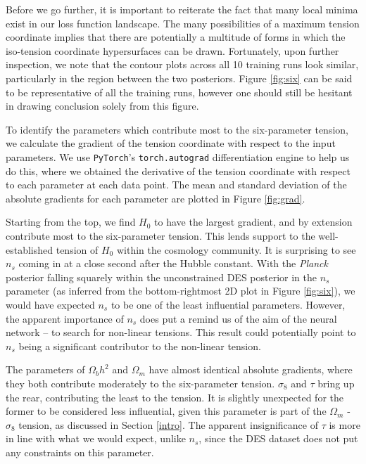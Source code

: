 \documentclass[%
 reprint,
 amsmath,amssymb,
 aps,
]{revtex4-2}
\begin{document}
Before we go further, it is important to reiterate the fact that many local minima exist in our loss function landscape. The many possibilities of a maximum tension coordinate implies that there are potentially a multitude of forms in which the iso-tension coordinate hypersurfaces can be drawn. Fortunately, upon further inspection, we note that the contour plots across all 10 training runs look similar, particularly in the region between the two posteriors. Figure \ref{fig:six} can be said to be representative of all the training runs, however one should still be hesitant in drawing conclusion solely from this figure.

To identify the parameters which contribute most to the six-parameter tension, we calculate the gradient of the tension coordinate with respect to the input parameters. We use \texttt{PyTorch}'s \texttt{torch.autograd} differentiation engine to help us do this, where we obtained the derivative of the tension coordinate with respect to each parameter at each data point. The mean and standard deviation of the absolute gradients for each parameter are plotted in Figure \ref{fig:grad}.

Starting from the top, we find $H_0$ to have the largest gradient, and by extension contribute most to the six-parameter tension. This lends support to the well-established tension of $H_0$ within the cosmology community. It is surprising to see $n_s$ coming in at a close second after the Hubble constant. With the \textit{Planck} posterior falling squarely within the unconstrained DES posterior in the $n_s$ parameter (as inferred from the bottom-rightmost 2D plot in Figure \ref{fig:six}), we would have expected $n_s$ to be one of the least influential parameters. However, the apparent importance of $n_s$ does put a remind us of the aim of the neural network -- to search for non-linear tensions. This result could potentially point to $n_s$ being a significant contributor to the non-linear tension. 

The parameters of $\Omega_b h^2$ and $\Omega_m$ have almost identical absolute gradients, where they both contribute moderately to the six-parameter tension. $\sigma_8$ and $\tau$ bring up the rear, contributing the least to the tension. It is slightly unexpected for the former to be considered less influential, given this parameter is part of the $\Omega_m$ - $\sigma_8$ tension, as discussed in Section \ref{intro}. The apparent insignificance of $\tau$ is more in line with what we would expect, unlike $n_s$, since the DES dataset does not put any constraints on this parameter. 
\end{document}
